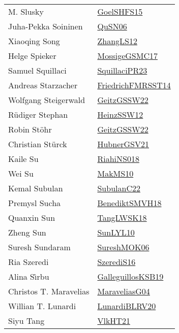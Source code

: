 {\begin{longtable}{p{4cm}p{20cm}}
M. Slusky & \href{articles/GoelSHFS15.pdf}{GoelSHFS15}\cite{GoelSHFS15} \\
Juha{-}Pekka Soininen & \href{papers/QuSN06.pdf}{QuSN06}\cite{QuSN06} \\
Xiaoqing Song & \href{papers/ZhangLS12.pdf}{ZhangLS12}\cite{ZhangLS12} \\
Helge Spieker & \href{papers/MossigeGSMC17.pdf}{MossigeGSMC17}\cite{MossigeGSMC17} \\
Samuel Squillaci & \href{papers/SquillaciPR23.pdf}{SquillaciPR23}\cite{SquillaciPR23} \\
Andreas Starzacher & \href{}{FriedrichFMRSST14}\cite{FriedrichFMRSST14} \\
Wolfgang Steigerwald & \href{papers/GeitzGSSW22.pdf}{GeitzGSSW22}\cite{GeitzGSSW22} \\
R{\"{u}}diger Stephan & \href{articles/HeinzSSW12.pdf}{HeinzSSW12}\cite{HeinzSSW12} \\
Robin St{\"{o}}hr & \href{papers/GeitzGSSW22.pdf}{GeitzGSSW22}\cite{GeitzGSSW22} \\
Christian St{\"{u}}rck & \href{articles/HubnerGSV21.pdf}{HubnerGSV21}\cite{HubnerGSV21} \\
Kaile Su & \href{papers/RiahiNS018.pdf}{RiahiNS018}\cite{RiahiNS018} \\
Wei Su & \href{papers/MakMS10.pdf}{MakMS10}\cite{MakMS10} \\
Kemal Subulan & \href{articles/SubulanC22.pdf}{SubulanC22}\cite{SubulanC22} \\
Premysl Sucha & \href{papers/BenediktSMVH18.pdf}{BenediktSMVH18}\cite{BenediktSMVH18} \\
Quanxin Sun & \href{}{TangLWSK18}\cite{TangLWSK18} \\
Zheng Sun & \href{papers/SunLYL10.pdf}{SunLYL10}\cite{SunLYL10} \\
Suresh Sundaram & \href{}{SureshMOK06}\cite{SureshMOK06} \\
Ria Szeredi & \href{papers/SzerediS16.pdf}{SzerediS16}\cite{SzerediS16} \\
Alina S{\^{\i}}rbu & \href{papers/GalleguillosKSB19.pdf}{GalleguillosKSB19}\cite{GalleguillosKSB19} \\
Christos T. Maravelias & \href{papers/MaraveliasG04.pdf}{MaraveliasG04}\cite{MaraveliasG04} \\
Willian T. Lunardi & \href{articles/LunardiBLRV20.pdf}{LunardiBLRV20}\cite{LunardiBLRV20} \\
Siyu Tang & \href{articles/VlkHT21.pdf}{VlkHT21}\cite{VlkHT21} \\

\end{longtable}}
